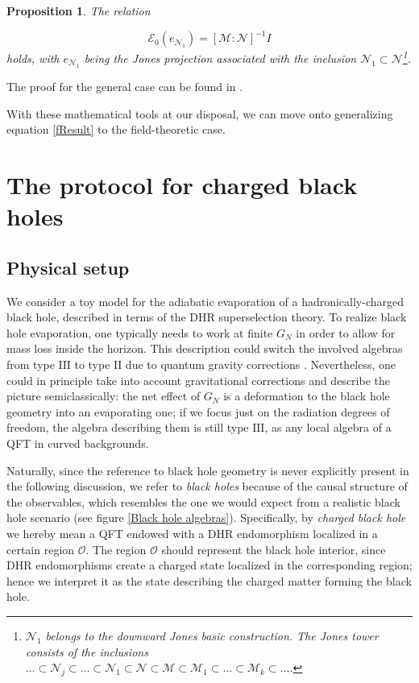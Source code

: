 \documentclass[a4paper,11pt]{article}
\newtheorem{Proposition}{Proposition}[subsection]
\begin{document}
\begin{Proposition}
    The relation

    \begin{equation}
        \mathcal{E}_0(e_{{\mathcal{N}}_1}) = [\mathcal{M} : \mathcal{N}]^{-1} I
    \end{equation}
    holds, with $e_{{\mathcal{N}}_1}$ being the Jones projection associated with the inclusion $\mathcal{N}_1 \subset \mathcal{N}$\footnote{$\mathcal{N}_1$ belongs to the \textit{downward} Jones basic construction. The Jones tower consists of the inclusions $...\subset \mathcal{N}_j \subset ... \subset \mathcal{N}_1 \subset \mathcal{N} \subset \mathcal{M} \subset \mathcal{M}_1 \subset ... \subset \mathcal{M}_k \subset ...$.}.
    \label{Index inv}
\end{Proposition}

The proof for the general case can be found in \cite{Longo}.

With these mathematical tools at our disposal, we can move onto generalizing equation \ref{fResult} to the field-theoretic case.

\section{The protocol for charged black holes}
\subsection{Physical setup}

We consider a toy model for the adiabatic evaporation of a hadronically-charged black hole, described in terms of the DHR superselection theory.
To realize black hole evaporation, one typically needs to work at finite $G_N$ in order to allow for mass loss inside the horizon. This description could switch the involved algebras from type $\mathrm{III}$ to type $\mathrm{II}$ due to quantum gravity corrections \cite{Witten-Longo}. Nevertheless, one could in principle take into account gravitational corrections and describe the picture semiclassically: the net effect of $G_N$ is a deformation to the black hole geometry into an evaporating one; if we focus just on the radiation degrees of freedom, the algebra describing them is still type $\mathrm{III}$, as any local algebra of a QFT in curved backgrounds.

Naturally, since the reference to black hole geometry is never explicitly present in the following discussion, we refer to \textit{black holes} because of the causal structure of the observables, which resembles the one we would expect from a realistic black hole scenario (see figure \ref{Black hole algebras}). Specifically, by \textit{charged black hole} we hereby mean a QFT endowed with a DHR endomorphism localized in a certain region $\mathcal{O}$. The region $\mathcal{O}$ should represent the black hole interior, since DHR endomorphisms create a charged state localized in the corresponding region; hence we interpret it as the state describing the charged matter forming the black hole. 
\end{document}
